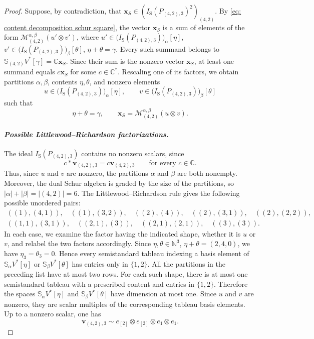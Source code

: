 \documentclass[a4paper,reqno]{amsart}
\theoremstyle{plainnopunct}
\theoremstyle{definitionnopunct}
\newcommand{\C}{\mathbb{C}}
\newcommand{\N}{\mathbb{N}}
\renewcommand{\S}{\mathbb{S}}
\newcommand{\cM}{\mathcal{M}}
\newcommand{\bx}{\mathbf{x}}
\newcommand{\bv}{\mathbf{v}}
\begin{document}
\begin{proof}
Suppose, by contradiction, that $\bx_S
\in
\left(
I_{\mathrm S}(P_{(4,2),3})^2
\right)_{(4,2)}$.
By \eqref{eq: content decomposition schur square}, the vector $\bx_S$ is a sum of elements of the form $\cM^{\alpha,\beta}_{(4,2)}
(u'\otimes v')$, where
$u'
\in
\bigl(I_{\mathrm S}(P_{(4,2),3})\bigr)_\alpha[\eta]$, $v'
\in
\bigl(I_{\mathrm S}(P_{(4,2),3})\bigr)_\beta[\theta]$, $\eta+\theta=\gamma$.
Every such summand belongs to $\S_{(4,2)}V^*[\gamma] = \C\bx_S$.
Since their sum is the nonzero vector $\bx_S$, at least one summand equals $c\bx_S$ for some $c\in\C^*$. Rescaling one of its factors, we obtain partitions $\alpha,\beta$, contents $\eta,\theta$, and nonzero elements
\[u
\in
\bigl(I_{\mathrm S}(P_{(4,2),3})\bigr)_\alpha[\eta], \qquad v
\in
\bigl(I_{\mathrm S}(P_{(4,2),3})\bigr)_\beta[\theta]
\]
such that
\[\eta+\theta=\gamma,
\qquad
\bx_S
=
\cM^{\alpha,\beta}_{(4,2)}
(u\otimes v).
\]

\paragraph{\textit{Possible Littlewood--Richardson factorizations.}}

The ideal $I_{\mathrm S}(P_{(4,2),3})$ contains no nonzero scalars, since
\[
c*\bv_{(4,2),3}
=
c\bv_{(4,2),3}
\qquad
\text{for every }c\in\C.
\]
Thus, since $u$ and $v$ are nonzero, the partitions $\alpha$ and $\beta$ are both nonempty. Moreover, the dual Schur algebra is graded by the size of the partitions, so $|\alpha|+|\beta| = |(4,2)| = 6$.
The Littlewood--Richardson rule gives the following possible unordered pairs:
\[
\begin{gathered}
((1),(4,1)),
\quad
((1),(3,2)),
\quad
((2),(4)),
\quad
((2),(3,1)),
\quad
((2),(2,2)),
\\
((1,1),(3,1)),
\quad
((2,1),(3)),
\quad
((2,1),(2,1)),
\quad
((3),(3)).
\end{gathered}
\]
In each case, we examine the factor having the indicated shape, whether it is $u$ or $v$, and relabel the two factors accordingly.
Since $\eta,\theta\in\N^3$,  $\eta+\theta=(2,4,0)$, we have $\eta_3=\theta_3=0$.
Hence every semistandard tableau indexing a basis element of $\S_\alpha V^*[\eta]$ or  $\S_\beta V^*[\theta]$ has entries only in $\{1,2\}$. All the partitions in the preceding list have at most two rows. For each such shape, there is at most one semistandard tableau with a prescribed content and entries in $\{1,2\}$. Therefore the spaces $\S_\alpha V^*[\eta]$ and $\S_\beta V^*[\theta]$ have dimension at most one. Since $u$ and $v$ are nonzero, they are scalar multiples of the corresponding tableau basis elements. Up to a nonzero scalar, one has
\begin{equation}
\label{eq: highest weight vector 42}
\bv_{(4,2),3}
\sim
e_{[2]}
\otimes
e_{[2]}
\otimes
e_1
\otimes
e_1.
\end{equation}


\end{proof}
\end{document}
